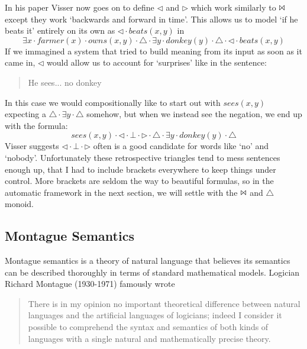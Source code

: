 \documentclass[12pt]{article}
\begin{document}
In his paper Visser now goes on to define $\triangleleft$ and $\triangleright$ which work similarly to $\Bowtie$ except they work `backwards and forward in time'. This allows us to model `if he beats it' entirely on its own as $\triangleleft\cdot beats(x,y)$ in
\begin{equation}
  \exists x \cdot farmer(x) \cdot owns(x,y) \cdot \triangle \cdot \exists y \cdot donkey(y) \cdot \triangle \cdot \triangleleft \cdot beats(x,y)
\end{equation}
%
If we immagined a system that tried to build meaning from its input as soon as it came in, $\triangleleft$ would allow us to account for `surprises' like in the sentence:
\begin{quotation}
He sees... no donkey
\end{quotation}
%
In this case we would compositionally like to start out with $sees(x,y)$ expecting a $\triangle\cdot\exists y\cdot\triangle$ somehow, but when we instead see the negation, we end up with the formula:
%
\begin{equation}
sees(x,y) \cdot \triangleleft \cdot \bot \cdot \triangleright \cdot \triangle \cdot \exists y \cdot donkey(y) \cdot \triangle
\end{equation}
%
Visser suggests $\triangleleft\cdot\bot\cdot\triangleright$ often is a good candidate for words like `no' and `nobody'. Unfortunately these retrospective triangles tend to mess sentences enough up, that I had to include brackets everywhere to keep things under control. More brackets are seldom the way to beautiful formulas, so in the automatic framework in the next section, we will settle with the $\Bowtie$ and $\triangle$ monoid.

\subsection{Montague Semantics}
Montague semantics is a theory of natural language that believes its semantics can be described thoroughly in terms of standard mathematical models. Logician Richard Montague (1930-1971) famously wrote
\begin{quotation}
There is in my opinion no important theoretical difference between natural languages and the artificial languages of logicians; indeed I consider it possible to comprehend the syntax and semantics of both kinds of languages with a single natural and mathematically precise theory. \cite{montague1970universal}
\end{quotation}
\end{document}
